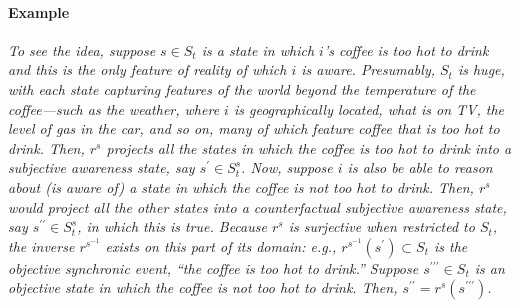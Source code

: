 \documentclass[
11pt,
titlepage,
reqno,
]{article}%
\theoremstyle{definition}
\begin{document}
\paragraph{Example} 
\emph{
	To see the idea, suppose $s\in S_t$ is a state in which $i$'s coffee is too hot to drink and this is the only feature of reality of which $i$ is aware.
Presumably, $S_t$ is huge, with each state capturing features of the world beyond the temperature of the coffee---such as the weather, where $i$ is geographically located, what is on TV, the level of gas in the car, and so on, many of which feature coffee that is too hot to drink.
Then, $r^s$ projects all the states in which the coffee is too hot to drink into a subjective awareness state, say $s^{\prime}\in S^s_t$. 
Now, suppose $i$ is also be able to reason about (is aware of) a state in which the coffee is not too hot to drink.
Then, $r^s$ would project all the other states into a counterfactual subjective awareness state, say $s^{\prime\prime}\in S^s_t$, in which this is true.
Because $r^s$ is surjective when restricted to $S_t$, the inverse $r^{s^{-1}}$ exists on this part of its domain: e.g., $r^{s^{-1}}(s^{\prime})\subset S_t$ is the objective synchronic event, ``the coffee is too hot to drink.'' 
Suppose $s^{\prime\prime\prime}\in S_t$ is an objective state in which the coffee is not too hot to drink. 
Then, $s^{\prime\prime}=r^s(s^{\prime\prime\prime})$.
}
\end{document}
